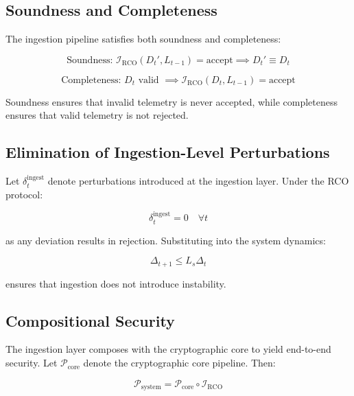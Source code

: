 \subsection{Soundness and Completeness}

The ingestion pipeline satisfies both soundness and completeness:

\begin{equation}
\text{Soundness: } \mathcal{I}_{\text{RCO}}(D_t', L_{t-1}) = \text{accept} \implies D_t' \equiv D_t
\end{equation}

\begin{equation}
\text{Completeness: } D_t \text{ valid } \implies \mathcal{I}_{\text{RCO}}(D_t, L_{t-1}) = \text{accept}
\end{equation}

Soundness ensures that invalid telemetry is never accepted, while completeness ensures that valid telemetry is not rejected.

\subsection{Elimination of Ingestion-Level Perturbations}

Let $\delta_t^{\text{ingest}}$ denote perturbations introduced at the ingestion layer. Under the RCO protocol:

\begin{equation}
\delta_t^{\text{ingest}} = 0 \quad \forall t
\end{equation}

as any deviation results in rejection. Substituting into the system dynamics:

\begin{equation}
\Delta_{t+1} \leq L_s \Delta_t
\end{equation}

ensures that ingestion does not introduce instability.

\subsection{Compositional Security}

The ingestion layer composes with the cryptographic core to yield end-to-end security. Let $\mathcal{P}_{\text{core}}$ denote the cryptographic core pipeline. Then:

\begin{equation}
\mathcal{P}_{\text{system}} = \mathcal{P}_{\text{core}} \circ \mathcal{I}_{\text{RCO}}
\end{equation}

